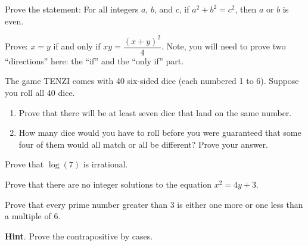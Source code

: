 \documentclass[10pt,]{book}
\theoremstyle{plain}
\theoremstyle{definition}
\theoremstyle{definition}
\theoremstyle{definition}
\theoremstyle{definition}
\numberwithin{equation}{chapter}
\begin{document}
\begin{divisionexercise}{9}\hypertarget{exercise-244}{}
\hypertarget{p-2160}{}%
Prove the statement: For all integers \(a\), \(b\), and \(c\), if \(a^2 + b^2 = c^2\), then \(a\) or \(b\) is even.%
\end{divisionexercise}%
\begin{divisionexercise}{10}\hypertarget{exercise-245}{}
\hypertarget{p-2161}{}%
Prove: \(x=y\) if and only if \(xy=\dfrac{(x+y)^2}{4}\). Note, you will need to prove two ``directions'' here: the ``if'' and the ``only if'' part.%
\end{divisionexercise}%
\begin{divisionexercise}{11}\hypertarget{exercise-246}{}
\hypertarget{p-2162}{}%
The game TENZI comes with 40 six-sided dice (each numbered 1 to 6). Suppose you roll all 40 dice. \leavevmode%
\begin{enumerate}[label=(\alph*)]
\item\hypertarget{li-710}{}Prove that there will be at least seven dice that land on the same number.%
\item\hypertarget{li-711}{}\hypertarget{p-2163}{}%
How many dice would you have to roll before you were guaranteed that some four of them would all match or all be different? Prove your answer.%
\end{enumerate}
%
\end{divisionexercise}%
\begin{divisionexercise}{12}\hypertarget{exercise-247}{}
\hypertarget{p-2169}{}%
Prove that \(\log(7)\) is irrational.%
\end{divisionexercise}%
\begin{divisionexercise}{13}\hypertarget{exercise-248}{}
\hypertarget{p-2174}{}%
Prove that there are no integer solutions to the equation \(x^2 = 4y + 3\).%
\end{divisionexercise}%
\begin{divisionexercise}{14}\hypertarget{exercise-249}{}
\hypertarget{p-2175}{}%
Prove that every prime number greater than 3 is either one more or one less than a multiple of 6.%
\par\smallskip%
\noindent\textbf{Hint}.\hypertarget{hint-96}{}\quad%
\hypertarget{p-2176}{}%
Prove the contrapositive by cases.%
\end{divisionexercise}%
\end{document}
